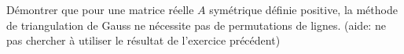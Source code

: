 
\begin{exercice}\label{exoSerieCinq0005}

	Démontrer que pour une matrice réelle $A$ symétrique définie positive, la méthode de triangulation de Gauss ne nécessite pas de permutations de lignes. (aide: ne pas chercher à utiliser le résultat de l'exercice précédent)

\end{exercice}
